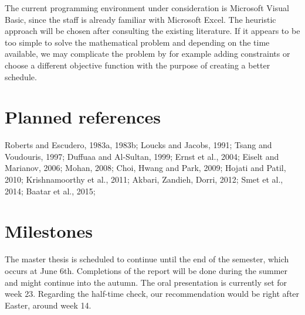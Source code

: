 \documentclass{article}
\begin{document}
The current programming environment under consideration is Microsoft Visual Basic, since the staff is already familiar with Microsoft Excel. The heuristic approach will be chosen after consulting the existing literature. If it appears to be too simple to solve the mathematical problem and depending on the time available, we may complicate the problem by for example adding constraints or choose a different objective function with the purpose of creating a better schedule.

\pagebreak
\section*{Planned references}
Roberts and Escudero, 1983a, 1983b; Loucks and Jacobs, 1991; Tsang and Voudouris, 1997; Duffuaa and Al-Sultan, 1999; Ernst et al., 2004; Eiselt and Marianov, 2006; Mohan, 2008; Choi, Hwang and Park, 2009; Hojati and Patil, 2010; Krishnamoorthy et al., 2011; Akbari, Zandieh, Dorri, 2012; Smet et al., 2014; Baatar et al., 2015;

\section*{Milestones}
The master thesis is scheduled to continue until the end of the semester, which occurs at June 6th. Completions of the report will be done during the summer and might continue into the autumn. The oral presentation is currently set for week 23. Regarding the half-time check, our recommendation would be right after Easter, around week 14.
\end{document}
